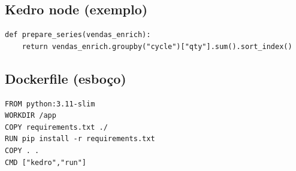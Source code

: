 \subsection*{Kedro node (exemplo)}
\begin{verbatim}
def prepare_series(vendas_enrich):
    return vendas_enrich.groupby("cycle")["qty"].sum().sort_index()
\end{verbatim}

\subsection*{Dockerfile (esboço)}
\begin{verbatim}
FROM python:3.11-slim
WORKDIR /app
COPY requirements.txt ./
RUN pip install -r requirements.txt
COPY . .
CMD ["kedro","run"]
\end{verbatim}
